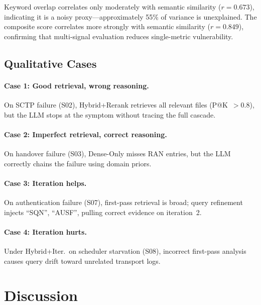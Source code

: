 \documentclass[11pt,a4paper]{article}
\begin{document}
Keyword overlap correlates only moderately with semantic similarity
($r{=}0.673$), indicating it is a noisy proxy---approximately 55\%
of variance is unexplained.
The composite score correlates more strongly with semantic similarity
($r{=}0.849$), confirming that multi-signal evaluation reduces
single-metric vulnerability.

\subsection{Qualitative Cases}
\label{sec:cases}

\paragraph{Case 1: Good retrieval, wrong reasoning.}
On SCTP failure (S02), Hybrid+Rerank retrieves all relevant files
(P@K~${>}0.8$), but the LLM stops at the symptom without tracing the
full cascade.

\paragraph{Case 2: Imperfect retrieval, correct reasoning.}
On handover failure (S03), Dense-Only misses RAN entries, but the LLM
correctly chains the failure using domain priors.

\paragraph{Case 3: Iteration helps.}
On authentication failure (S07), first-pass retrieval is broad;
query refinement injects ``SQN'', ``AUSF'', pulling correct evidence
on iteration~2.

\paragraph{Case 4: Iteration hurts.}
Under Hybrid+Iter.\ on scheduler starvation (S08), incorrect
first-pass analysis causes query drift toward unrelated transport logs.


\section{Discussion}
\label{sec:discussion}
\end{document}
